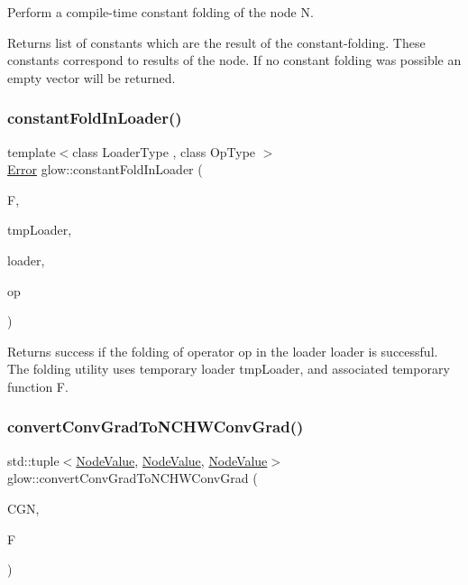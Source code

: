 Perform a compile-\/time constant folding of the node {\ttfamily N}. \begin{DoxyReturn}{Returns}
list of constants which are the result of the constant-\/folding. These constants correspond to results of the node. If no constant folding was possible an empty vector will be returned. 
\end{DoxyReturn}
\mbox{\label{namespaceglow_a6f10f8f52d528b3ceb40892376bc1fb9}} 
\subsubsection{\texorpdfstring{constant\+Fold\+In\+Loader()}{constantFoldInLoader()}}
{\footnotesize\ttfamily template$<$class Loader\+Type , class Op\+Type $>$ \\
\hyperlink{namespaceglow_afdb176c3a672ef66db0ecfc19a8d39bf}{Error} glow\+::constant\+Fold\+In\+Loader (\begin{DoxyParamCaption}\item[{\hyperlink{classglow_1_1_function}{Function} $\ast$}]{F,  }\item[{Loader\+Type \&}]{tmp\+Loader,  }\item[{Loader\+Type $\ast$}]{loader,  }\item[{const Op\+Type \&}]{op }\end{DoxyParamCaption})}

\begin{DoxyReturn}{Returns}
success if the folding of operator {\ttfamily op} in the loader {\ttfamily loader} is successful. The folding utility uses temporary loader {\ttfamily tmp\+Loader}, and associated temporary function {\ttfamily F}. 
\end{DoxyReturn}
\mbox{\label{namespaceglow_a277fade8bad1b16fc8c084ce52ba6f92}} 
\subsubsection{\texorpdfstring{convert\+Conv\+Grad\+To\+N\+C\+H\+W\+Conv\+Grad()}{convertConvGradToNCHWConvGrad()}}
{\footnotesize\ttfamily std\+::tuple$<$\hyperlink{structglow_1_1_node_value}{Node\+Value}, \hyperlink{structglow_1_1_node_value}{Node\+Value}, \hyperlink{structglow_1_1_node_value}{Node\+Value}$>$ glow\+::convert\+Conv\+Grad\+To\+N\+C\+H\+W\+Conv\+Grad (\begin{DoxyParamCaption}\item[{\hyperlink{classglow_1_1_convolution_grad_node}{Convolution\+Grad\+Node} $\ast$}]{C\+GN,  }\item[{\hyperlink{classglow_1_1_function}{Function} $\ast$}]{F }\end{DoxyParamCaption})\hspace{0.3cm}{\ttfamily [inline]}}

